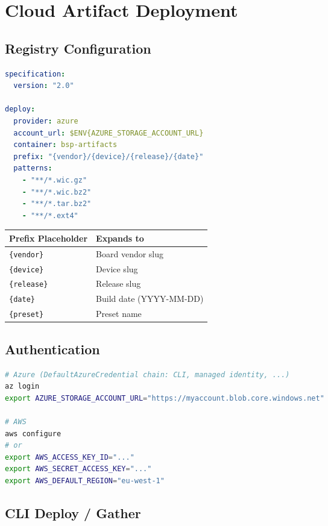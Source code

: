 \documentclass[a4paper,11pt]{article}
\begin{document}
\section{Cloud Artifact Deployment}

\subsection{Registry Configuration}

\begin{lstlisting}[language=YAML]
specification:
  version: "2.0"

deploy:
  provider: azure
  account_url: $ENV{AZURE_STORAGE_ACCOUNT_URL}
  container: bsp-artifacts
  prefix: "{vendor}/{device}/{release}/{date}"
  patterns:
    - "**/*.wic.gz"
    - "**/*.wic.bz2"
    - "**/*.tar.bz2"
    - "**/*.ext4"
\end{lstlisting}

\begin{tabularx}{\linewidth}{L{36mm}X}
  \textbf{Prefix Placeholder} & \textbf{Expands to} \\
  \toprule
   \texttt{\{vendor\}}  & Board vendor slug \\
    \texttt{\{device\}}  & Device slug \\
   \texttt{\{release\}} & Release slug \\
    \texttt{\{date\}}    & Build date (YYYY-MM-DD) \\
   \texttt{\{preset\}}  & Preset name \\
  \bottomrule
\end{tabularx}

\subsection{Authentication}

\begin{lstlisting}[language=Bash]
# Azure (DefaultAzureCredential chain: CLI, managed identity, ...)
az login
export AZURE_STORAGE_ACCOUNT_URL="https://myaccount.blob.core.windows.net"

# AWS
aws configure
# or
export AWS_ACCESS_KEY_ID="..."
export AWS_SECRET_ACCESS_KEY="..."
export AWS_DEFAULT_REGION="eu-west-1"
\end{lstlisting}

\subsection{CLI Deploy / Gather}
\end{document}

